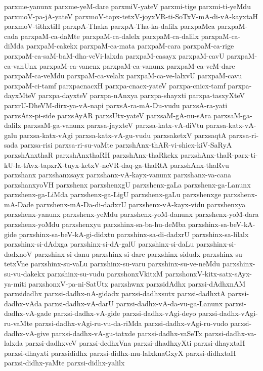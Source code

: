 {parxme-yanunx
parxme-yeM-dare
parxmiV-yateV
parxmi-tige
parxmi-ti-yeMdu
parxmoV-pa-jA-yateV
parxmoV-tapx-tetxV-joyxVR-ti-SoTxV-mA-di-vA-kayxtaH
parxmoV-tithxtiH
parxpA-Thaka
parxpA-Tha-ka-dalilx
parxpaMca
parxpaM-cada
parxpaM-ca-daMte
parxpaM-ca-dalelx
parxpaM-ca-dalilx
parxpaM-ca-diMda
parxpaM-cakekx
parxpaM-ca-mata
parxpaM-cara
parxpaM-ca-rige
parxpaM-ca-saM-baM-dha-veVi-lalxda
parxpaM-casayx
parxpaM-cavU
parxpaM-ca-vanUnx
parxpaM-ca-vanenx
parxpaM-ca-vanunx
parxpaM-ca-veM-dare
parxpaM-ca-veMdu
parxpaM-ca-velalx
parxpaM-ca-ve-lalxvU
parxpaM-cavu
parxpaM-ci-tamf
parxpacnacxH
parxpa-cnacx-yateV
parxpa-cnicx-tamf
parxpa-dayxMteV
parxpa-dayxteV
parxpa-nAnxya
parxpa-shayxti
parxpa-tasxyXteV
parxrU-DheVM-dirx-ya-vA-napi
parxsA-ra-mA-Du-vudu
parxsA-ra-yati
parxsAtx-pi-side
parxsAyAR
parxsUtx-yateV
parxsaM-gA-nu-sAra
parxsaM-ga-dalilx
parxsaM-ga-vanunx
parxsa-jayxteV
parxsa-katx-vA-diVtu
parxsa-katx-vA-galu
parxsa-katx-vAgi
parxsa-katx-vA-gu-vudu
parxsaketxV
parxsaqtA
parxsa-ri-sada
parxsa-risi
parxsa-ri-su-vaMte
parxshAnx-thAR-vi-shicx-kiV-SaRyA
parxshAnxthaR
parxshAnxthaRH
parxshAnx-thaRkekx
parxshAnx-thaR-parx-ti-kU-la-tAvx-tapxrX-tuyx-ketxV-neVR-daq-ga-thaRtA
parxshAnx-thaRvu
parxshanx
parxshanxsayx
parxshanx-vA-kayx-vanunx
parxshanx-va-cana
parxshanxyoVH
parxshenx
parxshenxgU
parxshenx-gaLa
parxshenx-ga-Lanunx
parxshenx-ga-LiMda
parxshenx-ga-LigU
parxshenx-gaLu
parxshenxge
parxshenx-mA-Dade
parxshenx-mA-Da-di-dadxrU
parxshenx-vA-kayx-vidu
parxshenxya
parxshenx-yanunx
parxshenx-yeMdu
parxshenx-yoM-danunx
parxshenx-yoM-dara
parxshenx-yoMdu
parxshenxyu
parxshinx-sa-ba-hu-deMba
parxshinx-sa-beV-kA-gide
parxshinx-sa-beV-kA-gi-didxtu
parxshinx-sa-di-dadxrU
parxshinx-sa-lilalx
parxshinx-si-dAdxga
parxshinx-si-dA-galU
parxshinx-si-daLu
parxshinx-si-dadxnoV
parxshinx-si-danu
parxshinx-si-dare
parxshinx-sidudx
parxshinx-su-tetxVne
parxshinx-su-vaLu
parxshinx-su-varu
parxshinx-su-ve-neMdu
parxshinx-su-vu-dakekx
parxshinx-su-vudu
parxshonxVkitxM
parxshonxV-kitx-satx-sAyx-ya-miti
parxshonxV-pa-ni-SatUtx
parxshwnx
parxsidAdhx
parxsi-dAdhxnAM
parxsidadhx
parxsi-dadhx-nA-gidadx
parxsi-dadhxsutx
parxsi-dadhxtA
parxsi-dadhx-vAda
parxsi-dadhx-vA-darU
parxsi-dadhx-vA-da-vu-ga-Lanunx
parxsi-dadhx-vA-gade
parxsi-dadhx-vA-gide
parxsi-dadhx-vAgi-deyo
parxsi-dadhx-vAgi-ru-vaMte
parxsi-dadhx-vAgi-ru-vu-da-riMda
parxsi-dadhx-vAgi-ru-vudo
parxsi-dadhx-vA-give
parxsi-dadhx-vA-gu-tatxde
parxsi-dadhx-vaSeTx
parxsi-dadhx-va-lalxda
parxsi-dadhxveV
parxsi-dedhxVna
parxsi-dhadhxyXti
parxsi-dhayxtaH
parxsi-dhayxti
parxsididhx
parxsi-didhx-mu-lalxknaGxyX
parxsi-didhxtaH
parxsi-didhx-yaMte
parxsi-didhx-yalilx
}
